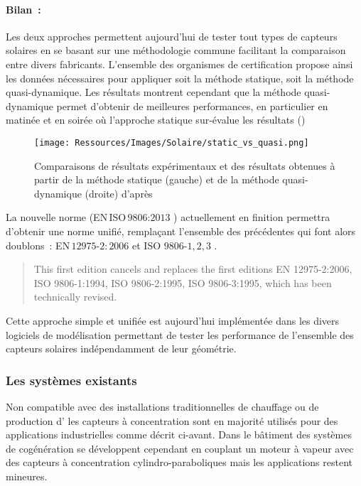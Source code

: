 \paragraph{Bilan~:} %
\label{par:bilan}
Les deux approches permettent aujourd’hui de tester tout types de capteurs solaires
en se basant sur une méthodologie commune facilitant la comparaison entre divers
fabricants. L’ensemble des organismes de certification propose ainsi les données nécessaires
pour appliquer soit la méthode statique, soit la méthode quasi-dynamique.
Les résultats montrent cependant que la méthode quasi-dynamique permet d’obtenir de
meilleures performances, en particulier en matinée et en soirée
où l’approche statique sur-évalue les résultats ()

\begin{figure}
    \centering
    \texttt{[image: Ressources/Images/Solaire/static\_vs\_quasi.png]}
    \caption{Comparaisons de résultats expérimentaux et des résultats obtenues
             à partir de la méthode statique (gauche) et de la méthode quasi-dynamique (droite)
             d’après \textcite{Zambolin20101382}}
    \label{fig:compare_static_quasi_dyn}
\end{figure}

La nouvelle norme (EN\,ISO\,$9806$:$2013$ ) actuellement en finition permettra d’obtenir
une norme unifié, remplaçant l’ensemble des précédentes qui font alors doublons~:
EN\,$12975$-$2:2006$ et ISO $9806$-$1,2,3$ \parencite{ISO98062013}.
\blockquote{This first edition cancels and replaces the first editions EN 12975-2:2006,
ISO 9806-1:1994, ISO 9806-2:1995, ISO 9806-3:1995, which has been technically revised.}
Cette approche simple et unifiée est aujourd’hui implémentée dans les divers logiciels
de modélisation permettant de tester les performance de l’ensemble des capteurs solaires
indépendamment de leur géométrie.


\subsubsection{Les systèmes existants} %
\label{ssub:les_systemes_existants}
Non compatible avec des installations traditionnelles de chauffage ou de production
d’ les capteurs à concentration sont en majorité utilisés pour des applications
industrielles comme décrit ci-avant. Dans le bâtiment des systèmes de cogénération
se développent cependant en couplant un moteur à vapeur avec des capteurs à concentration
cylindro-paraboliques mais les applications restent mineures.

